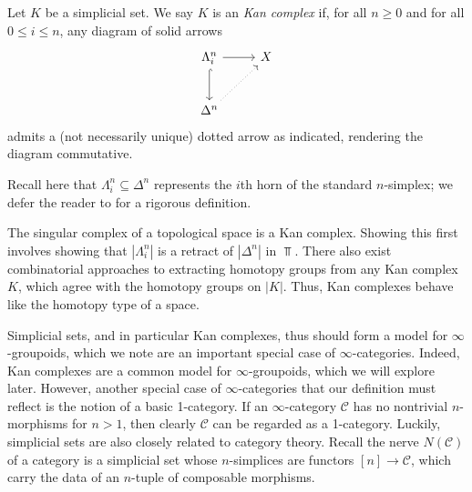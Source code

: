 \begin{definition}\label{1.1.2.1}
	Let $K$ be a simplicial set. We say $K$ is an \emph{Kan complex} if, for all $n\geq 0$ and for all $0\leq i\leq n$, any diagram of solid arrows
	\[\begin{tikzcd}[row sep = 2.5em, column sep = 2.5em]
	\Lambda_i^n\ar[r] \ar[hook, d]  & X \\
	\Delta^n \ar[dotted, ur]  & 
	\end{tikzcd}\]
	admits a (not necessarily unique) dotted arrow as indicated, rendering the diagram commutative.
\end{definition}

Recall here that $\Lambda_i^n\subseteq \Delta^n$ represents the $i$th horn of the standard $n$-simplex; we defer the reader to \cite[\S3.4]{ssets} for a rigorous definition.

\begin{remark}\label{1.1.2.2}
	The singular complex of a topological space is a Kan complex. Showing this first involves showing that $\left| \Lambda_i^n \right| $ is a retract of $\left| \Delta^n \right| $ in $\Top $. There also exist combinatorial approaches to extracting homotopy groups from any Kan complex $K$, which agree with the homotopy groups on $\left| K \right| $. Thus, Kan complexes behave like the homotopy type of a space.
\end{remark}

Simplicial sets, and in particular Kan complexes, thus should form a model for $\infty $-groupoids, which we note are an important special case of $\infty $-categories. Indeed, Kan complexes are a common model for $\infty $-groupoids, which we will explore later. However, another special case of $\infty $-categories that our definition must reflect is the notion of a basic 1-category. If an $\infty $-category $\mathcal{C} $ has no nontrivial $n$-morphisms for $n>1$, then clearly $\mathcal{C} $ can be regarded as a 1-category. Luckily, simplicial sets are also closely related to category theory. Recall the nerve $N(\mathcal{C} )$ of a category is a simplicial set whose $n$-simplices are functors $[n]\to \mathcal{C} $, which carry the data of an $n$-tuple of composable morphisms.


